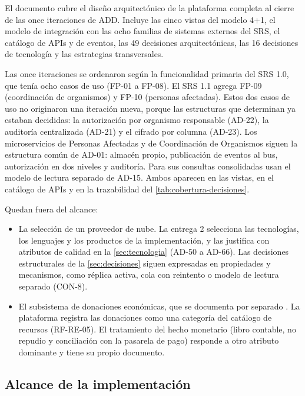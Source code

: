 \documentclass[11pt,letterpaper]{article}
\begin{document}
El documento cubre el diseño arquitectónico de la plataforma completa al cierre de las once
iteraciones de ADD. Incluye las cinco vistas del modelo 4+1, el modelo de integración con las ocho
familias de sistemas externos del SRS, el catálogo de APIs y de eventos, las 49 decisiones
arquitectónicas, las 16 decisiones de tecnología y las estrategias transversales.

Las once iteraciones se ordenaron según la funcionalidad primaria del SRS 1.0, que tenía ocho casos
de uso (FP-01 a FP-08). El SRS 1.1 agrega FP-09 (coordinación de organismos) y FP-10 (personas
afectadas). Estos dos casos de uso no originaron una iteración nueva, porque las estructuras que
determinan ya estaban decididas: la autorización por organismo responsable (AD-22), la auditoría
centralizada (AD-21) y el cifrado por columna (AD-23). Los microservicios de Personas Afectadas y de
Coordinación de Organismos siguen la estructura común de AD-01: almacén propio, publicación de
eventos al bus, autorización en dos niveles y auditoría. Para sus consultas consolidadas usan el
modelo de lectura separado de AD-15. Ambos aparecen en las vistas, en el catálogo de APIs y en la
trazabilidad del \cref{tab:cobertura-decisiones}.

Quedan fuera del alcance:

\begin{itemize}
  \item La selección de un proveedor de nube. La entrega 2 selecciona las tecnologías, los lenguajes
        y los productos de la implementación, y las justifica con atributos de calidad en la
        \cref{sec:tecnologia} (AD-50 a AD-66). Las decisiones estructurales de la
        \cref{sec:decisiones} siguen expresadas en propiedades y mecanismos, como réplica activa,
        cola con reintento o modelo de lectura separado (CON-8).
  \item El subsistema de donaciones económicas, que se documenta por separado \cite{donaciones}.
        La plataforma registra las donaciones como una categoría del catálogo de recursos
        (RF-RE-05). El tratamiento del hecho monetario (libro contable, no repudio y conciliación
        con la pasarela de pago) responde a otro atributo dominante y tiene su propio documento.
\end{itemize}

\subsection{Alcance de la implementación}
\label{sec:alcance-impl}
\end{document}
